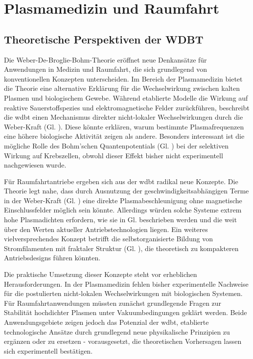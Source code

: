 \chapter{Plasmamedizin und Raumfahrt}
\section{Theoretische Perspektiven der WDBT}
Die Weber-De-Broglie-Bohm-Theorie eröffnet neue Denkansätze für Anwendungen in Medizin und Raumfahrt, die sich grundlegend von konventionellen Konzepten unterscheiden. Im Bereich
der Plasmamedizin bietet die Theorie eine alternative Erklärung für die Wechselwirkung zwischen kalten Plasmen und biologischem Gewebe. Während etablierte Modelle die Wirkung auf
reaktive Sauerstoffspezies und elektromagnetische Felder zurückführen, beschreibt die \gls{wdbt} einen Mechanismus direkter nicht-lokaler Wechselwirkungen durch die Weber-Kraft
(Gl. ). Diese könnte erklären, warum bestimmte Plasmafrequenzen eine höhere biologische Aktivität zeigen als andere. Besonders interessant ist die mögliche Rolle des
Bohm'schen Quantenpotentials (Gl. ) bei der selektiven Wirkung auf Krebszellen, obwohl dieser Effekt bisher nicht experimentell nachgewiesen wurde.

Für Raumfahrtantriebe ergeben sich aus der \gls{wdbt} radikal neue Konzepte. Die Theorie legt nahe, dass durch Ausnutzung der geschwindigkeitsabhängigen Terme in der
Weber-Kraft (Gl. ) eine direkte Plasmabeschleunigung ohne magnetische Einschlussfelder möglich sein könnte. Allerdings würden solche Systeme extrem hohe Plasmadichten
erfordern, wie sie in Gl.  beschrieben werden und die weit über den Werten aktueller Antriebstechnologien liegen. Ein weiteres vielversprechendes Konzept betrifft die
selbstorganisierte Bildung von Stromfilamenten mit fraktaler Struktur (Gl. ), die theoretisch zu kompakteren Antriebsdesigns führen könnten.

Die praktische Umsetzung dieser Konzepte steht vor erheblichen Herausforderungen. In der Plasmamedizin fehlen bisher experimentelle Nachweise für die postulierten nicht-lokalen
Wechselwirkungen mit biologischen Systemen. Für Raumfahrtanwendungen müssten zunächst grundlegende Fragen zur Stabilität hochdichter Plasmen unter Vakuumbedingungen geklärt werden.
Beide Anwendungsgebiete zeigen jedoch das Potenzial der \gls{wdbt}, etablierte technologische Ansätze durch grundlegend neue physikalische Prinzipien zu ergänzen oder zu
ersetzen - vorausgesetzt, die theoretischen Vorhersagen lassen sich experimentell bestätigen.
